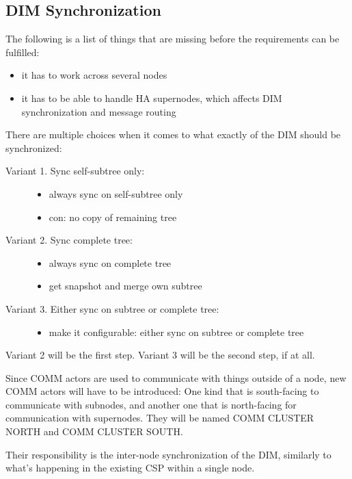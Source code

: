 \subsection{DIM Synchronization}
The following is a list of things that are missing before the requirements can be fulfilled:
\begin{itemize}
\item it has to work across several nodes
\item it has to be able to handle HA supernodes, which affects DIM synchronization and message routing
\end{itemize}

There are multiple choices when it comes to what exactly of the DIM should be synchronized:

\begin{description}
	\item [Variant 1. Sync self-subtree only:] \hfill
		\begin{itemize}
			\item always sync on self-subtree only
			\item con: no copy of remaining tree
		\end{itemize}

	\item [Variant 2. Sync complete tree:] \hfill
		\begin{itemize}
			\item always sync on complete tree
			\item get snapshot and merge own subtree
		\end{itemize}

	\item [Variant 3. Either sync on subtree or complete tree:] \hfill
		\begin{itemize}
			\item make it configurable: either sync on subtree or complete tree
		\end{itemize}
\end{description}

Variant 2 will be the first step. Variant 3 will be the second step, if at all.

Since COMM actors are used to communicate with things outside of a node, new COMM
actors will have to be introduced: One kind that is south-facing to communicate
with subnodes, and another one that is north-facing for communication with
supernodes. They will be named COMM CLUSTER NORTH and COMM CLUSTER SOUTH.

Their responsibility is the inter-node synchronization of the DIM, similarly to
what's happening in the existing CSP within a single node.

